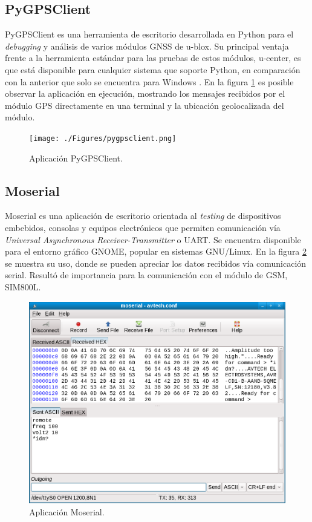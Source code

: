 \subsection{PyGPSClient}

PyGPSClient es una herramienta de escritorio desarrollada en Python para el \textit{debugging} y análisis de varios módulos GNSS de u-blox. Su principal ventaja frente a la herramienta estándar para las pruebas de estos módulos, u-center, es que está disponible para cualquier sistema que soporte Python, en comparación con la anterior que solo se encuentra para Windows \citep{PYGPSCLIENT:1}. En la figura \ref{fig:pygpsclient} es posible observar la aplicación en ejecución, mostrando los mensajes recibidos por el módulo GPS directamente en una terminal y la ubicación geolocalizada del módulo.

\begin{figure}[H]
	\centering
	\texttt{[image: ./Figures/pygpsclient.png]}
	\caption{Aplicación PyGPSClient.}
	\label{fig:pygpsclient}
\end{figure}

\subsection{Moserial}

Moserial es una aplicación de escritorio orientada al \textit{testing} de dispositivos embebidos, consolas y equipos electrónicos que permiten comunicación vía \textit{Universal Asynchronous Receiver-Transmitter} o UART. Se encuentra disponible para el entorno gráfico GNOME, popular en sistemas GNU/Linux. En la figura \ref{fig:moserial} se muestra su uso, donde se pueden apreciar los datos recibidos vía comunicación serial. Resultó de importancia para la comunicación con el módulo de GSM, SIM800L.

\begin{figure}[H]
	\centering
	\includegraphics[width=1\textwidth]{./Figures/moserial.png}
	\caption{Aplicación Moserial.}
	\label{fig:moserial}
\end{figure}


